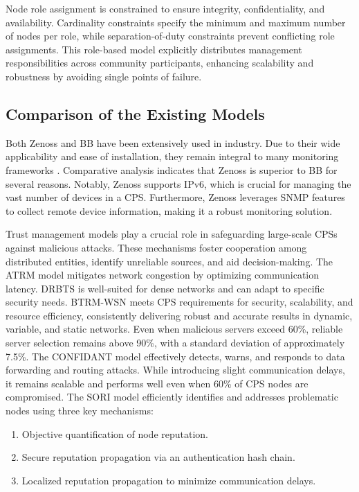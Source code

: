 Node role assignment is constrained to ensure integrity, confidentiality, and availability. Cardinality constraints specify the minimum and maximum number of nodes per role, while separation-of-duty constraints prevent conflicting role assignments. This role-based model explicitly distributes management responsibilities across community participants, enhancing scalability and robustness by avoiding single points of failure.

\subsection{Comparison of the Existing Models}
Both Zenoss and BB have been extensively used in industry. Due to their wide applicability and ease of installation, they remain integral to many monitoring frameworks \cite{Gupta2015}. Comparative analysis indicates that Zenoss is superior to BB for several reasons. Notably, Zenoss supports IPv6, which is crucial for managing the vast number of devices in a CPS. Furthermore, Zenoss leverages SNMP features to collect remote device information, making it a robust monitoring solution.

Trust management models play a crucial role in safeguarding large-scale CPSs against malicious attacks. These mechanisms foster cooperation among distributed entities, identify unreliable sources, and aid decision-making. The ATRM model mitigates network congestion by optimizing communication latency. DRBTS is well-suited for dense networks and can adapt to specific security needs. BTRM-WSN meets CPS requirements for security, scalability, and resource efficiency, consistently delivering robust and accurate results in dynamic, variable, and static networks. Even when malicious servers exceed 60\%, reliable server selection remains above 90\%, with a standard deviation of approximately 7.5\%. The CONFIDANT model effectively detects, warns, and responds to data forwarding and routing attacks. While introducing slight communication delays, it remains scalable and performs well even when 60\% of CPS nodes are compromised. The SORI model efficiently identifies and addresses problematic nodes using three key mechanisms:

\begin{enumerate}
 \item Objective quantification of node reputation.
 \item Secure reputation propagation via an authentication hash chain.
 \item Localized reputation propagation to minimize communication delays.
\end{enumerate}

